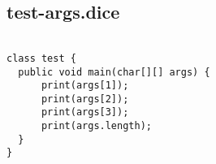 \subsection{test-args.dice}
\begin{verbatim}

class test {
  public void main(char[][] args) {
      print(args[1]);
      print(args[2]);
      print(args[3]);
      print(args.length);
  }
}
\end{verbatim}